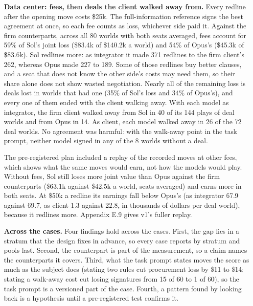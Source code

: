 \textbf{Data center: fees, then deals the client walked away from.} Every redline after the opening move costs \$25k. The
full-information reference signs the best agreement at once, so each fee counts as loss, whichever side paid it.
Against the firm counterparts, across all 80 worlds with both seats averaged, fees account for 59\% of Sol's joint loss
(\$83.4k of \$140.2k a world) and 54\% of Opus's (\$45.3k of \$83.6k). Sol redlines more: as integrator it made 371
redlines to the firm client's 262, whereas Opus made 227 to 189. Some of those redlines buy better clauses, and a seat
that does not know the other side's costs may need them, so their share alone does not show wasted negotiation. Nearly
all of the remaining loss is deals lost in worlds that had one (35\% of Sol's loss and 34\% of Opus's), and every one of
them ended with the client walking away. With each model as integrator, the firm client walked away from Sol in 40 of
its 144 plays of deal worlds and from Opus in 14. As client, each model walked away in 26 of the 72 deal worlds. No
agreement was harmful: with the walk-away point in the task prompt, neither model signed in any of the 8 worlds
without a deal.

The pre-registered plan included a replay of the recorded moves at other fees, which shows what the same moves would
earn, not how the models would play. Without fees, Sol still loses more joint value than Opus against the firm
counterparts (\$63.1k against \$42.5k a world, seats averaged) and earns more in both seats. At \$50k a redline its
earnings fall below Opus's (as integrator 67.9 against 69.7, as client 1.3 against 22.8, in thousands of dollars per
deal world), because it redlines more. Appendix E.9 gives v1's fuller replay.

\textbf{Across the cases.} Four findings hold across the cases. First, the gap lies in a stratum that the design fixes in
advance, so every case reports by stratum and pools last. Second, the counterpart is part of the measurement, so a
claim names the counterparts it covers. Third, what the task prompt states moves the score as much as the subject does
(stating two rules cut procurement loss by \$11 to \$14; stating a walk-away cost cut losing signatures from 15 of 60 to
1 of 60), so the task prompt is a versioned part of the case. Fourth, a pattern found by looking back is a hypothesis
until a pre-registered test confirms it.
